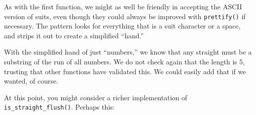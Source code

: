 As with the first function, we might as well be friendly in accepting
the ASCII version of suits, even though they could always be improved
with \texttt{prettify()} if necessary. The pattern looks for everything
that is a suit character or a space, and strips it out to create a
simplified ``hand.''

\newpage

With the simplified hand of just ``numbers,'' we know that any straight
must be a substring of the run of all numbers. We do not check again
that the length is 5, trusting that other functions have validated this.
We could easily add that if we wanted, of course.

At this point, you might consider a richer implementation of
\texttt{is\_straight\_flush()}. Perhaps this:

\begin{Shaded}
\begin{Highlighting}[]
\OperatorTok{\textgreater{}\textgreater{}\textgreater{}} 
\OperatorTok{=}
\OperatorTok{=}
\OperatorTok{+} 

\OperatorTok{\textgreater{}\textgreater{}\textgreater{}}\NormalTok{)}
\OperatorTok{\textgreater{}\textgreater{}\textgreater{}}\NormalTok{)}
\end{Highlighting}
\end{Shaded}

